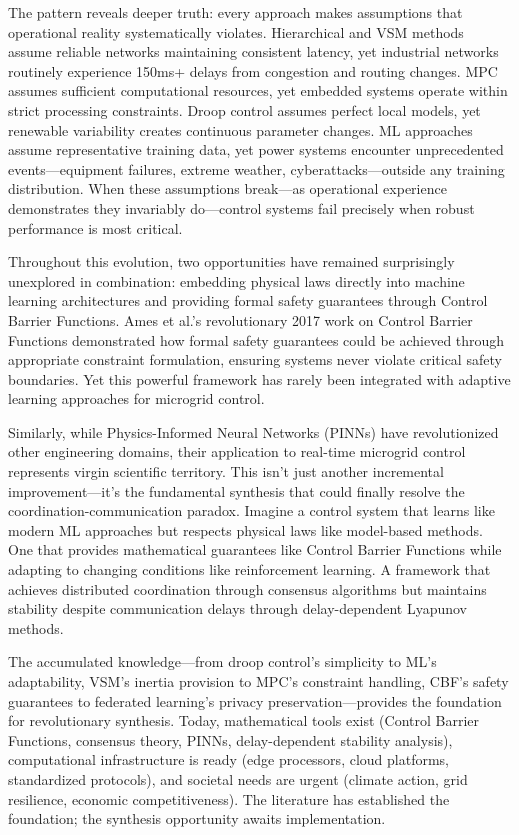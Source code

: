 \documentclass[12pt]{article}
\begin{document}
The pattern reveals deeper truth: every approach makes assumptions that operational reality systematically violates. Hierarchical and VSM methods assume reliable networks maintaining consistent latency, yet industrial networks routinely experience 150ms+ delays from congestion and routing changes. MPC assumes sufficient computational resources, yet embedded systems operate within strict processing constraints. Droop control assumes perfect local models, yet renewable variability creates continuous parameter changes. ML approaches assume representative training data, yet power systems encounter unprecedented events—equipment failures, extreme weather, cyberattacks—outside any training distribution. When these assumptions break—as operational experience demonstrates they invariably do—control systems fail precisely when robust performance is most critical.


Throughout this evolution, two opportunities have remained surprisingly unexplored in combination: embedding physical laws directly into machine learning architectures and providing formal safety guarantees through Control Barrier Functions. Ames et al.'s revolutionary 2017 work \cite{ames2017} on Control Barrier Functions demonstrated how formal safety guarantees could be achieved through appropriate constraint formulation, ensuring systems never violate critical safety boundaries. Yet this powerful framework has rarely been integrated with adaptive learning approaches for microgrid control.

Similarly, while Physics-Informed Neural Networks (PINNs) have revolutionized other engineering domains, their application to real-time microgrid control represents virgin scientific territory. This isn't just another incremental improvement—it's the fundamental synthesis that could finally resolve the coordination-communication paradox. Imagine a control system that learns like modern ML approaches but respects physical laws like model-based methods. One that provides mathematical guarantees like Control Barrier Functions while adapting to changing conditions like reinforcement learning. A framework that achieves distributed coordination through consensus algorithms but maintains stability despite communication delays through delay-dependent Lyapunov methods.

The accumulated knowledge—from droop control's simplicity to ML's adaptability, VSM's inertia provision to MPC's constraint handling, CBF's safety guarantees to federated learning's privacy preservation—provides the foundation for revolutionary synthesis. Today, mathematical tools exist (Control Barrier Functions, consensus theory, PINNs, delay-dependent stability analysis), computational infrastructure is ready (edge processors, cloud platforms, standardized protocols), and societal needs are urgent (climate action, grid resilience, economic competitiveness). The literature has established the foundation; the synthesis opportunity awaits implementation.
\end{document}
